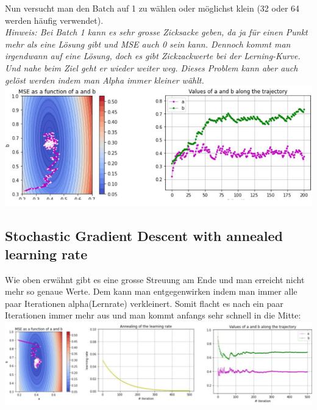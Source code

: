 Nun versucht man den Batch auf 1 zu wählen oder möglichst klein (32 oder 64 werden häufig verwendet).\\
\textit{Hinweis: Bei Batch 1 kann es sehr grosse Zicksacke geben, da ja für einen Punkt mehr als eine Lösung gibt und MSE auch 0 sein kann. Dennoch kommt man irgendwann auf eine Lösung, doch es gibt Zickzackwerte bei der Lerning-Kurve. Und nahe beim Ziel geht er wieder weiter weg. Dieses Problem kann aber auch gelöst werden indem man Alpha immer kleiner wählt.}
\includegraphics[width=\linewidth]{img/sgd_learning_curve.png}
\subsection{Stochastic Gradient Descent with annealed learning rate}
Wie oben erwähnt gibt es eine grosse Streuung am Ende und man erreicht nicht mehr so genaue Werte. Dem kann man entgegenwirken indem man immer alle paar Iterationen alpha(Lernrate) verkleinert. Somit flacht es nach ein paar Iterationen immer mehr aus und man kommt anfangs sehr schnell in die Mitte:
\includegraphics[width=\linewidth]{img/sgd_annealed_learning_curve.png}

